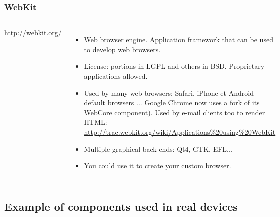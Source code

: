 \begin{frame}
  \frametitle{WebKit}
  \begin{columns}[T]
    \url{http://webkit.org/}
    \begin{itemize}
    \item Web browser engine. Application framework that can be used
      to develop web browsers.
    \item License: portions in LGPL and others in BSD. Proprietary
      applications allowed.
    \item Used by many web browsers: Safari, iPhone et Android default
      browsers ... Google Chrome now uses a fork of its WebCore component).
      Used by e-mail clients too to render HTML:
      \url{http://trac.webkit.org/wiki/Applications\%20using\%20WebKit}
    \item Multiple graphical back-ends: Qt4, GTK, EFL...
    \item You could use it to create your custom browser.
    \end{itemize}
    \includegraphics[width=\textwidth]{slides/sysdev-embedded-linux/webkit.png}
  \end{columns}
\end{frame}

\subsection{Example of components used in real devices}

